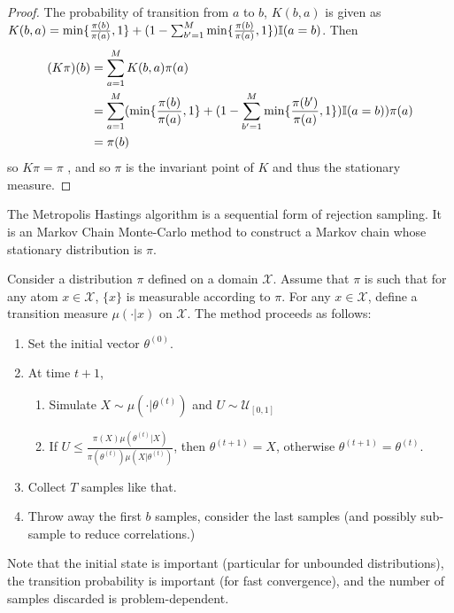 \begin{proof}
  The probability of transition from $a$ to $b$, $K(b, a)$ is given as
  $K(b, a) = \min \{ \frac{\pi(b)}{\pi(a)}, 1 \} + (1 -
  \sum_{b'=1}^{M} \min \{  \frac{\pi(b)}{\pi(a)}, 1 \}) \I{a = b}$.
  Then
  \begin{align}
    \label{eq:10}
    (K \pi)(b) &= \sum_{a=1}^{M} K(b, a) \pi(a) \\
    &= \sum_{a=1}^{M} (\min \{ \frac{\pi(b)}{\pi(a)} , 1 \} + (1 -
    \sum_{b'=1}^{M} \min \{ \frac{\pi(b')}{\pi(a)}, 1 \} ) \I{a=b})
    \pi(a) \\
    &= \pi(b)
  \end{align} so $K \pi = \pi$ , and so $\pi$ is the invariant point
  of $K$ and thus the stationary measure.
\end{proof}

\begin{defn}
  \label{sec:bayes-infer-assoc-3}
  The Metropolis Hastings algorithm is a sequential form of rejection
  sampling.  It is an Markov Chain Monte-Carlo method to construct a
  Markov chain whose stationary distribution is $\pi$.

  Consider a distribution $\pi$ defined on a domain $\mathcal{X}$.
  Assume that $\pi$ is such that for any atom $x \in \mathcal{X}$, $\{
  x \} $ is measurable according to $\pi$.  For any $x \in
  \mathcal{X}$, define a transition measure $\mu(\cdot | x)$ on
  $\mathcal{X}$.
  The method proceeds as follows:
  \begin{enumerate}
  \item Set the initial vector $\theta^{(0)}$.
  \item At time $t+1$,
    \begin{enumerate}
    \item Simulate $X \sim \mu(\cdot | \theta^{(t)})$ and $U \sim
      \mathcal{U}_{[0, 1]}$
    \item If $U \leq \frac{\pi(X) \mu(\theta^{(t)} |
        X)}{\pi(\theta^{(t)}) \mu(X | \theta^{(t)})}$, then
      $\theta^{(t+1)} = X$, otherwise $\theta^{(t+1)} = \theta^{(t)}$.
    \end{enumerate}
  \item Collect $T$ samples like that.
  \item Throw away the first $b$ samples, consider the last samples
    (and possibly sub-sample to reduce correlations.)
  \end{enumerate}

  Note that the initial state is important (particular for unbounded
  distributions), the transition probability is important (for fast
  convergence), and the number of samples discarded is
  problem-dependent.
\end{defn}

